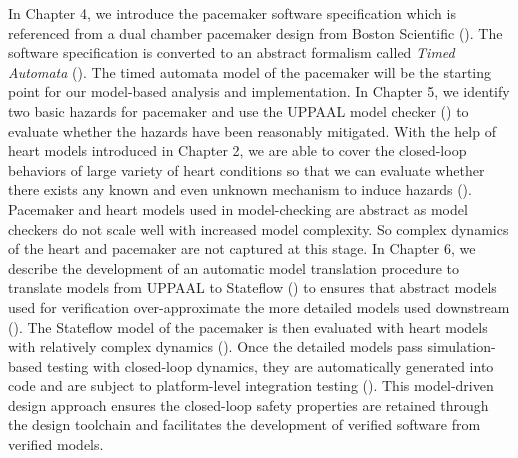 In Chapter 4, we introduce the pacemaker software specification which is referenced from a dual chamber pacemaker design from Boston Scientific (\cite{compass}). The software specification is converted to an abstract formalism called \emph{Timed Automata} (\cite{timed_automata}). The timed automata model of the pacemaker will be the starting point for our model-based analysis and implementation. In Chapter 5, we identify two basic hazards for pacemaker and use the UPPAAL model checker (\cite{uppaal}) to evaluate whether the hazards have been reasonably mitigated. With the help of heart models introduced in Chapter 2, we are able to cover the closed-loop behaviors of large variety of heart conditions so that we can evaluate whether there exists any known and even unknown mechanism to induce hazards (\cite{STTT13}). Pacemaker and heart models used in model-checking are abstract as model checkers do not scale well with increased model complexity. So complex dynamics of the heart and pacemaker are not captured at this stage. 
\newpage
In Chapter 6, we describe the development of an automatic model translation procedure to translate models from UPPAAL to Stateflow (\cite{stateflow}) to ensures that abstract models used for verification over-approximate the more detailed models used downstream (\cite{RTAS12}). The Stateflow model of the pacemaker is then evaluated with heart models with relatively complex dynamics (\cite{vhm_ecrts10, vhm_embc11,vhm_iccps11}). Once the detailed models pass simulation-based testing with closed-loop dynamics, they are automatically generated into code and are subject to platform-level integration testing (\cite{vhm_website}). This model-driven design approach ensures the closed-loop safety properties are retained through the design toolchain and facilitates the development of verified software from verified models.


